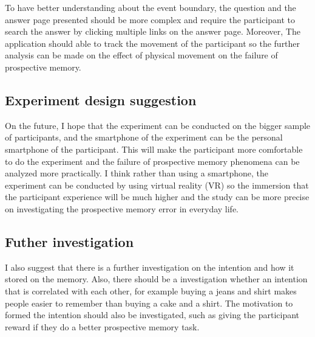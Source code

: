To have better understanding about the event boundary, the question and the answer page presented should be more complex and require
the participant to search the answer by clicking multiple links on the answer page.
Moreover, The application should able to track the movement of the participant so the further analysis can be made on the effect of physical movement
on the failure of prospective memory.


\subsection{Experiment design suggestion}
On the future, I hope that the experiment can be conducted on the bigger sample of participants, and the smartphone of the experiment can be the
personal smartphone of the participant. This will make the participant more comfortable to do the experiment and the failure of prospective memory
phenomena can be analyzed more practically.
I think rather than using a smartphone, the experiment can be conducted by using virtual reality (VR) so the immersion that the participant experience
will be much higher and the study can be more precise on investigating the prospective memory error in everyday life.

\subsection{Futher investigation}
I also suggest that there is a further investigation on the intention and how it stored on the memory. Also, there should be a investigation
whether an intention that is correlated with each other, for example buying a jeans and shirt makes people easier to remember than
buying a cake and a shirt. The motivation to formed the intention should also be investigated, such as giving the participant reward if they do
a better prospective memory task.



